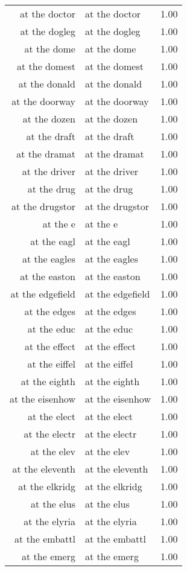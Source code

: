 \begin{table}[ht]
\begin{tabular}{rlr}
  at the doctor & at the doctor & 1.00 \\ 
  at the dogleg & at the dogleg & 1.00 \\ 
  at the dome & at the dome & 1.00 \\ 
  at the domest & at the domest & 1.00 \\ 
  at the donald & at the donald & 1.00 \\ 
  at the doorway & at the doorway & 1.00 \\ 
  at the dozen & at the dozen & 1.00 \\ 
  at the draft & at the draft & 1.00 \\ 
  at the dramat & at the dramat & 1.00 \\ 
  at the driver & at the driver & 1.00 \\ 
  at the drug & at the drug & 1.00 \\ 
  at the drugstor & at the drugstor & 1.00 \\ 
  at the e & at the e & 1.00 \\ 
  at the eagl & at the eagl & 1.00 \\ 
  at the eagles & at the eagles & 1.00 \\ 
  at the easton & at the easton & 1.00 \\ 
  at the edgefield & at the edgefield & 1.00 \\ 
  at the edges & at the edges & 1.00 \\ 
  at the educ & at the educ & 1.00 \\ 
  at the effect & at the effect & 1.00 \\ 
  at the eiffel & at the eiffel & 1.00 \\ 
  at the eighth & at the eighth & 1.00 \\ 
  at the eisenhow & at the eisenhow & 1.00 \\ 
  at the elect & at the elect & 1.00 \\ 
  at the electr & at the electr & 1.00 \\ 
  at the elev & at the elev & 1.00 \\ 
  at the eleventh & at the eleventh & 1.00 \\ 
  at the elkridg & at the elkridg & 1.00 \\ 
  at the elus & at the elus & 1.00 \\ 
  at the elyria & at the elyria & 1.00 \\ 
  at the embattl & at the embattl & 1.00 \\ 
  at the emerg & at the emerg & 1.00 \\ 

\end{tabular}
\end{table}
